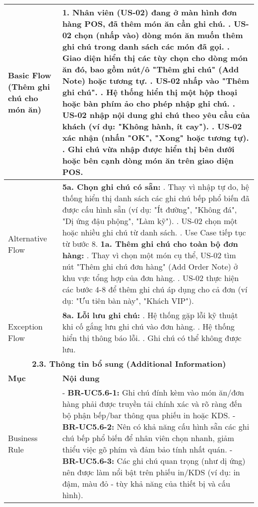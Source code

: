 \begin{longtable}{|m{4cm}|p{11cm}|}
Basic Flow (Thêm ghi chú cho món ăn) & 1. Nhân viên (US-02) đang ở màn hình đơn hàng POS, đã thêm món ăn cần ghi chú. \newline 2. US-02 chọn (nhấp vào) dòng món ăn muốn thêm ghi chú trong danh sách các món đã gọi. \newline 3. Giao diện hiển thị các tùy chọn cho dòng món ăn đó, bao gồm nút/ô "Thêm ghi chú" (Add Note) hoặc tương tự. \newline 4. US-02 nhấp vào "Thêm ghi chú". \newline 5. Hệ thống hiển thị một hộp thoại hoặc bàn phím ảo cho phép nhập ghi chú. \newline 6. US-02 nhập nội dung ghi chú theo yêu cầu của khách (ví dụ: "Không hành, ít cay"). \newline 7. US-02 xác nhận (nhấn "OK", "Xong" hoặc tương tự). \newline 8. Ghi chú vừa nhập được hiển thị bên dưới hoặc bên cạnh dòng món ăn trên giao diện POS. \\
\hline
Alternative Flow & \textbf{5a. Chọn ghi chú có sẵn:} \newline    1. Thay vì nhập tự do, hệ thống hiển thị danh sách các ghi chú bếp phổ biến đã được cấu hình sẵn (ví dụ: "Ít đường", "Không đá", "Dị ứng đậu phộng", "Làm kỹ"). \newline    2. US-02 chọn một hoặc nhiều ghi chú từ danh sách. \newline    3. Use Case tiếp tục từ bước 8. \newline \textbf{1a. Thêm ghi chú cho toàn bộ đơn hàng:} \newline    1. Thay vì chọn một món cụ thể, US-02 tìm nút "Thêm ghi chú đơn hàng" (Add Order Note) ở khu vực tổng hợp của đơn hàng. \newline    2. US-02 thực hiện các bước 4-8 để thêm ghi chú áp dụng cho cả đơn (ví dụ: "Ưu tiên bàn này", "Khách VIP"). \\
\hline
Exception Flow & \textbf{8a. Lỗi lưu ghi chú:} \newline    1. Hệ thống gặp lỗi kỹ thuật khi cố gắng lưu ghi chú vào đơn hàng. \newline    2. Hệ thống hiển thị thông báo lỗi. \newline    3. Ghi chú có thể không được lưu. \\
\hline
\multicolumn{2}{|c|}{\textbf{2.3. Thông tin bổ sung (Additional Information)}} \\
\hline
\textbf{Mục} & \textbf{Nội dung} \\
\hline
Business Rule & - \textbf{BR-UC5.6-1:} Ghi chú đính kèm vào món ăn/đơn hàng phải được truyền tải chính xác và rõ ràng đến bộ phận bếp/bar thông qua phiếu in hoặc KDS. \newline - \textbf{BR-UC5.6-2:} Nên có khả năng cấu hình sẵn các ghi chú bếp phổ biến để nhân viên chọn nhanh, giảm thiểu việc gõ phím và đảm bảo tính nhất quán. \newline - \textbf{BR-UC5.6-3:} Các ghi chú quan trọng (như dị ứng) nên được làm nổi bật trên phiếu in/KDS (ví dụ: in đậm, màu đỏ - tùy khả năng của thiết bị và cấu hình). \\

\end{longtable}
